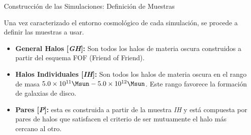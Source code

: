 \documentclass[8pt,fleqn]{beamer}
\begin{document}
\begin{frame}
\begin{block}{Construcción de las Simulaciones: Definición de Muestras}\justifying

Una vez caracterizado el entorno cosmológico de cada simulación, se procede
a definir las muestras a usar.

\begin{itemize}

\item \textbf{General Halos [\textit{GH}]:} Son todos los halos de materia 
oscura construidos a partir del esquema FOF (Friend of Friend).

\item \textbf{Halos Individuales [\textit{IH}]:} Son todos los halos de materia 
oscura en el rango de masa $5.0 \times 10^{11}\Msun - 5.0\times 10 ^{12}\Msun$.
Este rango favorece la formación de galaxias de disco.

\item \textbf{Pares [\textit{P}]:} esta es construida a partir de 
la muestra \textit{IH} y está compuesta por pares de halos que satisfacen el 
criterio de ser mutuamente el halo más cercano al otro.

\end{itemize}

\end{block}
\end{frame}
\end{document}
